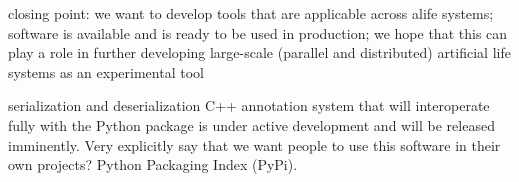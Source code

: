 closing point: we want to develop tools that are applicable across alife systems; software is available and is ready to be used in production; we hope that this can play a role in further developing large-scale (parallel and distributed) artificial life systems as an experimental tool

serialization and deserialization
C++ annotation system that will interoperate fully with the Python package is under active development and will be released imminently.
Very explicitly say that we want people to use this software in their own projects?
Python Packaging Index (PyPi).